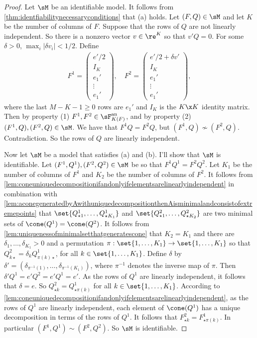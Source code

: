 \documentclass[12pt,a4paper]{article}
\begin{document}
\begin{proof}
Let $\sM$ be an identifiable model. It follows from  \cref{thm:identfiabilitynecessaryconditions} that (a) holds.
Let $(F,Q)\in \sM$ and let $K$ be the number of columns of $F$. Suppose that the rows of $Q$ are not linearly independent. So there is a nonzero vector $v\in\re^K$ so that $v'Q=0$. For some $\delta>0$, $\max_i |\delta v_i|<1/2$. Define 
\begin{align*}
    F^1 =\begin{pmatrix}
        e'/2\\ I_K \\ e_1'\\\vdots \\ e_1' 
    \end{pmatrix}, \quad F^2 =  \begin{pmatrix}
        e'/2+\delta v'\\ I_K \\ e_1'\\\vdots \\ e_1' 
    \end{pmatrix},
\end{align*}
where the last $M-K-1\ge 0$ rows are $e_1'$ and $I_K$ is the $K\x K$ identity matrix.  
Then by property (1) $F^1,F^2 \in \sF_{K(F)}^{\text{an}}$, and by property (2) $(F^1,Q),(F^2,Q)\in \sM$. We have that $F^1Q=F^2Q$, but $(F^1,Q)\not\sim (F^2,Q)$. Contradiction. So the rows of $Q$ are linearly independent. 

Now let $\sM$ be a model that satisfies (a) and (b). I'll show that $\sM$ is identifiable. Let $(F^1,Q^1),(F^2,Q^2)\in \sM$ be so that $F^1Q^1=F^2Q^2$. Let $K_1$ be the number of columns of $F^1$ and $K_2$ be the number of columns of $F^2$.  It follows from \cref{lem:coneuniquedecompositionifandonlyifelementsarelinearlyindependent} in combination with \cref{lem:aconegeneratedbyAwithuniquedecompositionthenAisminimalandconsistofextremepoints} that $\set{Q_{\star 1}^1,\ldots,Q_{\star K_1}^1}$ and $\set{Q_{\star 1}^2,\ldots,Q_{\star K_2}^2}$ are two minimal sets of $\cone(Q^1)=\cone(Q^2)$. It follows from \cref{lem:uniquenessofminimalsetthatgeneratescone} that $K_2=K_1$ and there are $\delta_1,\ldots,\delta_{K_1}>0$ and a permutation $\pi:\set{1,\ldots,K_1}\to \set{1,\ldots,K_1}$ so that $Q_{k\star }^2 = \delta_k Q_{ \pi(k)\star}^1$, for all $k\in\set{1,\ldots,K_1}$. Define $\delta$ by $\delta'=(\delta_{\pi^{-1}(1)},\ldots,\delta_{\pi^{-1}(K_1)})$, where $\pi^{-1}$ denotes the inverse map of $\pi$. Then $\delta'Q^1=e'Q^2=e'Q^1=e'$. As the rows of $Q^1$ are linearly independent, it follows that $\delta=e$. So $Q_{\star k}^2= Q_{\star \pi(k)}^1$ for all $k\in\set{1,\ldots,K_1}$. According to \cref{lem:coneuniquedecompositionifandonlyifelementsarelinearlyindependent}, as the rows of $Q^1$ are linearly independent, each element of $\cone(Q^1)$ has a unique decomposition in terms of the rows of $Q^1$. It follows that $F^2_{\star k}= F^1_{\star \pi(k)}$. In particular $(F^1,Q^1)\sim (F^2,Q^2)$. So $\sM$ is identifiable. 
\end{proof}
\end{document}
